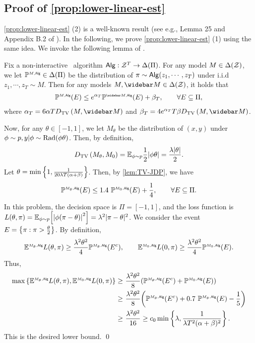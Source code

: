 \subsection{Proof of \cref{prop:lower-linear-est}}\label{appdx:proof-lower-linear}

\cref{prop:lower-linear-est} (2) is a well-known result (see e.g., Lemma 25 and Appendix B.2 of \citep{chen2024private}). In the following, we prove \cref{prop:lower-linear-est} (1) using the same idea. We invoke the following lemma of \citet{karwa2017finite}.
\begin{lemma}\label{lem:TV-JDP}
Fix a non-interactive \aJDP~algorithm $\mathsf{Alg}: \mathcal{Z}^T\to \Delta(\Pi)$. For any model $M\in\Delta(\mathcal{Z})$, we let $\mathbb{P}^{{\scriptscriptstyle M,\mathsf{Alg}}}\in\Delta(\Pi)$ be the distribution of $\pi\sim \mathsf{Alg}(z_1,\cdots,z_T)$ under i.i.d $z_1,\cdots,z_T\sim M$. Then for any models $M, \oM\in\DZ$, it holds that
\begin{align*}
    \PP\sups{M,\alg}(E)\leq e^{\alpha_T}\PP\sups{\oM,\alg}(E)+\beta_T, \qquad \forall E\subseteq \Pi,
\end{align*}
where $\alpha_T=6\alpha T\DTV{M,\oM}$ and $\beta_T=4e^{\alpha_T}T\beta\DTV{M,\oM}$.
\end{lemma}

Now, for any $\theta\in [-1,1]$, we let $M_\theta$ be the distribution of $(x,y)$ under $\phi\sim p, y|\phi\sim \mathrm{Rad}{\left( \phi\theta \right)}$. Then, by definition,
\begin{align*}
    D_{\mathrm{TV}}\left(M_\theta,M_0\right)=\mathbb{E}_{\phi\sim p} \frac12 |\phi\theta|=\frac{\lambda|\theta|}{2}.
\end{align*}
Let $\theta=\min\left\{ 1, \frac{1}{20\lambda T(\alpha+\beta)} \right\}$. Then, by \cref{lem:TV-JDP}, we have
\begin{align*}
    \mathbb{P}^{{\scriptscriptstyle M_\theta,\mathsf{Alg}}}(E)\leq 1.4~\mathbb{P}^{{\scriptscriptstyle M_0,\mathsf{Alg}}}(E)+\frac14, \qquad \forall E\subseteq \Pi. 
\end{align*}
In this problem, the decision space is $\Pi=[-1,1]$, and the loss function is $L(\theta,\pi)=\mathbb{E}_{\phi\sim p}{\left[ \left|\phi(\pi-\theta)\right|^2 \right]}=\lambda^2|\pi-\theta|^2$. We consider the event $E=\left\{\pi: \pi>\frac{\theta}{2}\right\}$. By definition,
\begin{align*}
    \mathbb{E}^{{\scriptscriptstyle M_\theta,\mathsf{Alg}}} L(\theta,\pi)\geq \frac{\lambda^2\theta^2}{4}\mathbb{P}^{{\scriptscriptstyle M_\theta,\mathsf{Alg}}}(E^c), \qquad
    \mathbb{E}^{{\scriptscriptstyle M_0,\mathsf{Alg}}} L(0,\pi)\geq \frac{\lambda^2\theta^2}{4}\mathbb{P}^{{\scriptscriptstyle M_0,\mathsf{Alg}}}(E).
\end{align*}
Thus,
\begin{align*}
    \max\left\{ \mathbb{E}^{{\scriptscriptstyle M_\theta,\mathsf{Alg}}} L(\theta,\pi), \mathbb{E}^{{\scriptscriptstyle M_0,\mathsf{Alg}}} L(0,\pi) \right\}\geq&~ \frac{\lambda^2\theta^2}{8}{\left(  \mathbb{P}^{{\scriptscriptstyle M_\theta,\mathsf{Alg}}}(E^c)+\mathbb{P}^{{\scriptscriptstyle M_0,\mathsf{Alg}}}(E)  \right)} \\
    \geq&~\frac{\lambda^2\theta^2}{8}{\left(  \mathbb{P}^{{\scriptscriptstyle M_\theta,\mathsf{Alg}}}(E^c)+0.7~\mathbb{P}^{{\scriptscriptstyle M_\theta,\mathsf{Alg}}}(E)-\frac{1}{5}  \right)} \\
    \geq&~ \frac{\lambda^2\theta^2}{16}
    \geq c_0\min\left\{ \lambda, \frac{1}{\lambda T^2(\alpha+\beta)^2} \right\}.
\end{align*}
This is the desired lower bound.
\qed
